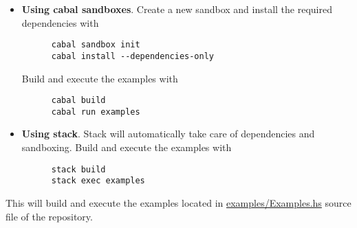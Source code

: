 \begin{itemize}
  \item \textbf{Using cabal sandboxes}. Create a new sandbox and install the
    required dependencies with

    \begin{verbatim}
      cabal sandbox init
      cabal install --dependencies-only
    \end{verbatim}

    Build and execute the examples with

    \begin{verbatim}
      cabal build
      cabal run examples
    \end{verbatim}

  \item \textbf{Using stack}. Stack will automatically take care of dependencies
    and sandboxing. Build and execute the examples with

    \begin{verbatim}
      stack build
      stack exec examples
    \end{verbatim}
\end{itemize}

This will build and execute the examples located in \href{https://github.com/%
GRACeFUL-project/GenericLibrary/blob/master/examples/%
Examples.hs}{examples/Examples.hs} source file of the repository.
